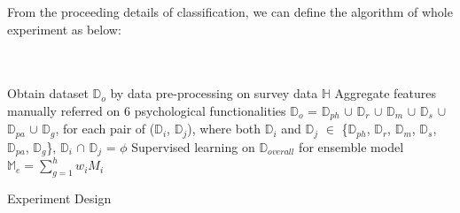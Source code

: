 \documentclass[10pt,journal,compsoc]{IEEEtran}
\begin{document}
From the proceeding details of classification, we can define the algorithm of whole experiment as below: \\\\\\
\IncMargin{2em}
\begin{algorithm}[h]
\BlankLine
Obtain dataset $\mathbb{D}_{o}$ by data pre-processing on survey data $\mathbb{H}$\;
Aggregate features manually referred on 6 psychological functionalities \;
$\mathbb{D}_{o}$ = $\mathbb{D}_{ph}$ $\cup$ $\mathbb{D}_{r}$ $\cup$ $\mathbb{D}_{m}$ $\cup$  $\mathbb{D}_{s}$ $\cup$ $\mathbb{D}_{pa}$ $\cup$ $\mathbb{D}_{g}$, for each pair of ($\mathbb{D}_{i}$, $\mathbb{D}_{j}$), where both $\mathbb{D}_{i}$ and  $\mathbb{D}_{j}$ $\in$ \{$\mathbb{D}_{ph}$, $\mathbb{D}_{r}$, $\mathbb{D}_{m}$, $\mathbb{D}_{s}$, $\mathbb{D}_{pa}$, $\mathbb{D}_{g}$\}, $\mathbb{D}_{i}$ $\cap$ $\mathbb{D}_{j}$ = $\phi$\;
Supervised learning on $\mathbb{D}_{overall}$ for ensemble model $\mathbb{M}_{e} = \sum_{g = 1}^{h} w_{i} M_{i} $\;
\caption{Experiment Design}\label{experiment}
\end{algorithm}\DecMargin{2em}
\end{document}
